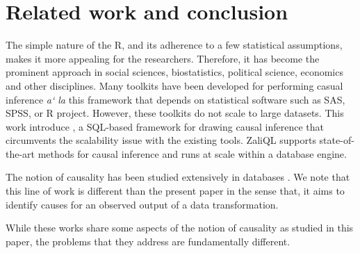 \vspace{-.42cm}
\section{Related work and conclusion}
\label{sec:rel}

The simple nature of the R, and its adherence to a few statistical assumptions, makes it more appealing for the researchers. Therefore,
 it has become the  prominent approach in social sciences, biostatistics, political science, economics
 and other disciplines. Many toolkits have been developed for performing casual inference {\em a` la} this framework that
 depends on  statistical software such as SAS, SPSS, or R project. However, these toolkits do not scale to large datasets. This work introduce  \GSQL,  a SQL-based framework for drawing causal
  inference that circumvents the scalability issue with the existing
  tools. ZaliQL supports state-of-the-art methods for causal
  inference and runs at scale within a database engine.


The notion of causality has been studied extensively in databases \cite{MeliouGMS2011,RoyS14,DBLP:conf/icdt/SalimiB15,SalimiTaPP16}.  We note that this line of work is different than the present paper in the sense that, it aims to identify causes for an observed output of a data transformation.  While these works share some aspects of the notion of causality as studied in this paper, the problems that they address are fundamentally different. 